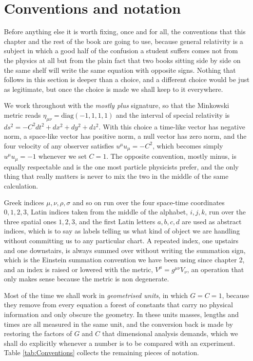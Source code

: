 \section{Conventions and notation}

    Before anything else it is worth fixing, once and for all, the conventions that this chapter and the rest of the book are going to use, because general relativity is a subject in which a good half of the confusion a student suffers comes not from the physics at all but from the plain fact that two books sitting side by side on the same shelf will write the same equation with opposite signs. Nothing that follows in this section is deeper than a choice, and a different choice would be just as legitimate, but once the choice is made we shall keep to it everywhere.

    We work throughout with the \textit{mostly plus} signature, so that the Minkowski metric reads $\eta_{\mu\nu} = \mathrm{diag}(-1,1,1,1)$ and the interval of special relativity is $ds^2 = -C^2dt^2 + dx^2 + dy^2 + dz^2$. With this choice a time-like vector has negative norm, a space-like vector has positive norm, a null vector has zero norm, and the four velocity of any observer satisfies $u^{\mu}u_{\mu} = -C^2$, which becomes simply $u^{\mu}u_{\mu} = -1$ whenever we set $C=1$. The opposite convention, mostly minus, is equally respectable and is the one most particle physicists prefer, and the only thing that really matters is never to mix the two in the middle of the same calculation.

    Greek indices $\mu,\nu,\rho,\sigma$ and so on run over the four space-time coordinates $0,1,2,3$, Latin indices taken from the middle of the alphabet, $i,j,k$, run over the three spatial ones $1,2,3$, and the first Latin letters $a,b,c,d$ are used as abstract indices, which is to say as labels telling us what kind of object we are handling without committing us to any particular chart. A repeated index, one upstairs and one downstairs, is always summed over without writing the summation sign, which is the Einstein summation convention we have been using since chapter 2, and an index is raised or lowered with the metric, $V^{\mu} = g^{\mu\nu}V_{\nu}$, an operation that only makes sense because the metric is non degenerate.

    Most of the time we shall work in \textit{geometrised units}, in which $G = C = 1$, because they remove from every equation a forest of constants that carry no physical information and only obscure the geometry. In these units masses, lengths and times are all measured in the same unit, and the conversion back is made by restoring the factors of $G$ and $C$ that dimensional analysis demands, which we shall do explicitly whenever a number is to be compared with an experiment. Table \ref{tab:Conventions} collects the remaining pieces of notation.

